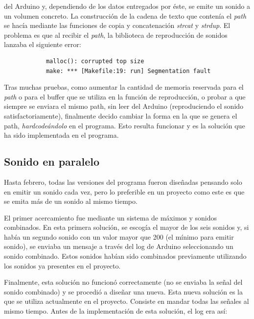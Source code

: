 \documentclass{article}
\begin{document}
\begin{itemize}
            del Arduino y, dependiendo de los datos entregados por éste, se emite un sonido a un volumen concreto.
            La construcción de la cadena de texto que contenía el \textit{path} se hacía mediante las funciones de
            copia y concatenación \textit{strcat} y \textit{strdup}. El problema es que al recibir el \textit{path},
            la biblioteca de reproducción de sonidos lanzaba el siguiente error:
            \begin{verbatim}
            malloc(): corrupted top size
            make: *** [Makefile:19: run] Segmentation fault
            \end{verbatim}
            Tras muchas pruebas, como aumentar la cantidad de memoria reservada para el \textit{path} o para el
            buffer que se utiliza en la función de reproducción, o probar a que siempre se enviara el mismo path,
            sin leer del Arduino (reproduciendo el sonido satisfactoriamente), finalmente decido cambiar la forma en
            la que se genera el path, \textit{hardcodeándolo} en el programa. Esto resulta funcionar y es la solución
            que ha sido implementada en el programa.
        \end{itemize}


    \subsection{Sonido en paralelo} %
    \label{sub:SonidoEnParalelo}

        Hasta febrero, todas las versiones del programa fueron diseñadas pensando solo en emitir un sonido cada vez,
        pero lo preferible en un proyecto como este es que se emita más de un sonido al mismo tiempo.\newline

        El primer acercamiento fue mediante un sistema de máximos y sonidos combinados. En esta primera solución, se
        escogía el mayor de los seis sonidos y, si había un segundo sonido con un valor mayor que 200 (el mínimo para
        emitir sonido), se enviaba un mensaje a través del log de Arduino seleccionando un sonido combinado. Estos
        sonidos habían sido combinados previamente utilizando los sonidos ya presentes en el proyecto.\newline

        Finalmente, esta solución no funcionó correctamente (no se enviaba la señal del sonido combinado) y se procedió
        a diseñar una nueva. Esta nueva solución es la que se utiliza actualmente en el proyecto. Consiste en mandar
        todas las señales al mismo tiempo. Antes de la implementación de esta solución, el log era así:
\end{document}
